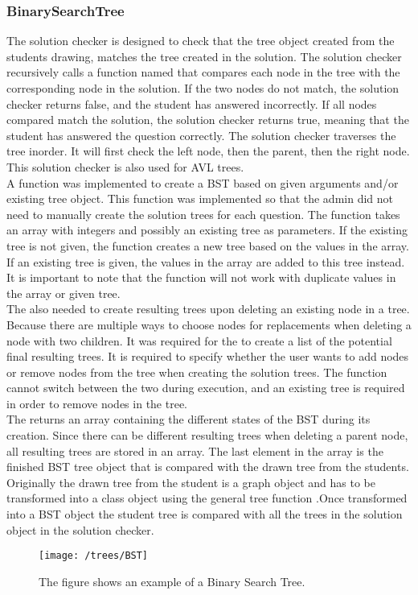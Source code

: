 \subsubsection{BinarySearchTree}
The solution checker is designed to check that the tree object created from the students drawing, matches the tree created in the solution. The solution checker recursively calls a function named  that compares each node in the tree with the corresponding node in the solution. If the two nodes do not match, the solution checker returns false, and the student has answered incorrectly. If all nodes compared match the solution, the solution checker returns true, meaning that the student has answered the question correctly. The solution checker traverses the tree inorder. It will first check the left node, then the parent, then the right node. This solution checker is also used for AVL trees.
\\[11pt]
A function  was implemented to create a BST based on given arguments and/or existing tree object. This function was implemented so that the admin did not need to manually create the solution trees for each question. The function takes an array with integers and possibly an existing tree as parameters. If the existing tree is not given, the function creates a new tree based on the values in the array. If an existing tree is given, the values in the array are added to this tree instead. It is important to note that the function will not work with duplicate values in the array or given tree.
\\[11pt]
The  also needed to create resulting trees upon deleting an existing node in a tree. Because there are multiple ways to choose nodes for replacements when deleting a node with two children. It was required for the  to create a list of the potential final resulting trees. It is required to specify whether the user wants to add nodes or remove nodes from the tree when creating the solution trees. The function cannot switch between the two during execution, and an existing tree is required in order to remove nodes in the tree.
\\[11pt]
The  returns an array containing the different states of the BST during its creation. Since there can be different resulting trees when deleting a parent node, all resulting trees are stored in an array. The last element in the array is the finished BST tree object that is compared with the drawn tree from the students. Originally the drawn tree from the student is a graph object and has to be transformed into a  class object using the general tree function .Once transformed into a BST object the student tree is compared with all the trees in the solution object in the solution checker.
\begin{figure}[H]
    \centering
    \texttt{[image: /trees/BST]}
    \caption{The figure shows an example of a Binary Search Tree.}    
    \label{fig:BST}
\end{figure}